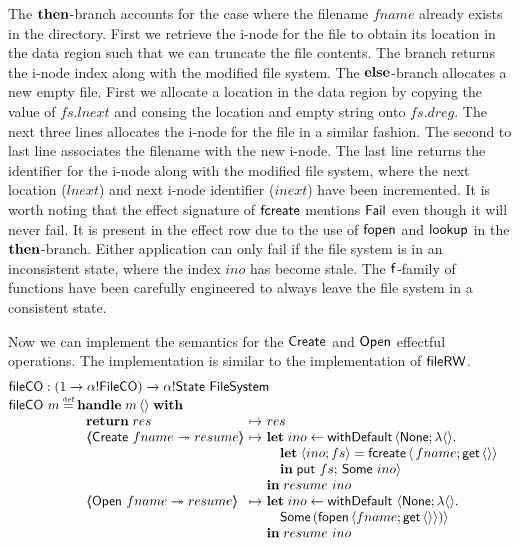 \documentclass[12pt,phd,lfcs,twoside,openright,logo,leftchapter,normalheadings]{infthesis}
\theoremstyle{plain}
\theoremstyle{definition}
\begin{document}
%
The $\mathbf{then}$-branch accounts for the case where the filename $fname$
already exists in the directory. First we retrieve the i-node for the
file to obtain its location in the data region such that we can
truncate the file contents.
%
The branch returns the i-node index along with the modified file
system. The $\mathbf{else}$-branch allocates a new empty file. First we
allocate a location in the data region by copying the value of
$fs.lnext$ and consing the location and empty string onto
$fs.dreg$. The next three lines allocates the i-node for the file in a
similar fashion. The second to last line associates the filename with
the new i-node. The last line returns the identifier for the i-node
along with the modified file system, where the next location ($lnext$)
and next i-node identifier ($inext$) have been incremented.
%
It is worth noting that the effect signature of $\mathsf{fcreate}$ mentions
$\mathsf{Fail}$ even though it will never fail. It is present in the effect
row due to the use of $\mathsf{fopen}$ and $\mathsf{lookup}$ in the
$\mathbf{then}$-branch. Either application can only fail if the file system is
in an inconsistent state, where the index $ino$ has become stale. The
$\mathsf{f}$-family of functions have been carefully engineered to always
leave the file system in a consistent state.
%

Now we can implement the semantics for the $\mathsf{Create}$ and $\mathsf{Open}$
effectful operations. The implementation is similar to the
implementation of $\mathsf{fileRW}$.
%
\[
  \bl
    \fileAlloc : (\UnitType \to \alpha \eff \dec{FileCO}) \to \alpha \eff \State~\FileSystem\\
    \fileAlloc~m \defas
        \ba[t]{@{}l}
           \Handle\;m\,\Unit\;\With\\
             ~\ba{@{~}l@{~}c@{~}l}
                 \Return\;res      &\mapsto& res\\
                 \OpCase{\UCreate}{fname}{resume} &\mapsto&
                   \bl
                     \Let\;ino \revto \faild\,\Record{\None; \lambda\Unit.\\
                       \quad\bl
                         \Let\;\Record{ino;fs} = \fcreate\,\Record{\,fname;\Uget\,\Unit}\\
                         \In\;\Uput~fs;\,\Some~ino}
                       \el\\
                     \In\; resume~ino
                   \el\\
                 \OpCase{\UOpen}{fname}{resume} &\mapsto&
                   \ba[t]{@{}l}
                      \Let\; ino \revto \faild~\Record{\None; \lambda \Unit.\\
                        \quad\Some\,(\fopen\,\Record{fname;\Uget\,\Unit})}\\
                      \In\;resume~ino
                   \ea
               \ea
         \ea
  \el
\]
%
\end{document}
